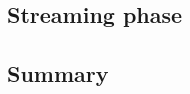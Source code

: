                     
\subsection{Streaming phase}

            


            

                          
\subsection{Summary}